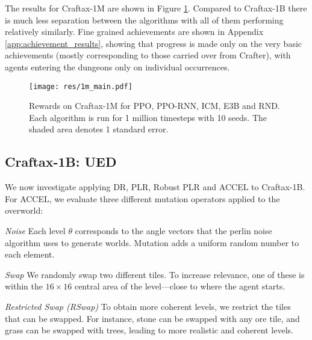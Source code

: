 \documentclass{article}
\theoremstyle{plain}
\theoremstyle{definition}
\theoremstyle{remark}
\begin{document}
The results for Craftax-1M are shown in Figure \ref{fig:1m_main}.  Compared to Craftax-1B there is much less separation between the algorithms with all of them performing relatively similarly.  Fine grained achievements are shown in Appendix \ref{app:achievement_results}, showing that progress is made only on the very basic achievements (mostly corresponding to those carried over from Crafter), with agents entering the dungeons only on individual occurrences.

\begin{figure}
    \centering
    \texttt{[image: res/1m\_main.pdf]}
    \caption{Rewards on Craftax-1M for PPO, PPO-RNN, ICM, E3B and RND.  Each algorithm is run for 1 million timesteps with 10 seeds.  The shaded area denotes 1 standard error.}
    \label{fig:1m_main}
\end{figure}

\subsection{Craftax-1B: UED}

We now investigate applying  DR, PLR, Robust PLR and ACCEL to Craftax-1B.  For ACCEL, we evaluate three different mutation operators applied to the overworld:

\textit{Noise} Each level $\theta$ corresponds to the angle vectors that the perlin noise algorithm uses to generate worlds. Mutation adds a uniform random number to each element.

\textit{Swap} We randomly swap two different tiles. To increase relevance, one of these is within the $16\times 16$ central area of the level---close to where the agent starts.

\textit{Restricted Swap (RSwap)} To obtain more coherent levels, we restrict the tiles that can be swapped.  For instance, stone can be swapped with any ore tile, and grass can be swapped with trees, leading to more realistic and coherent levels.
\end{document}

